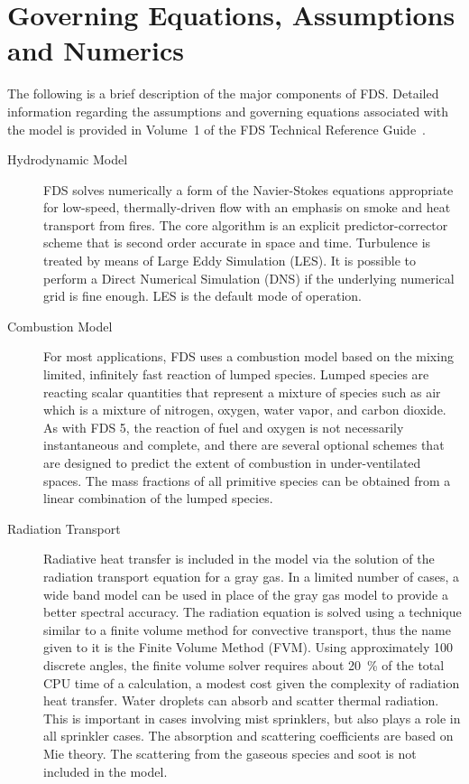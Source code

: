 \documentclass[11pt]{book}
\begin{document}
\section{Governing Equations, Assumptions and Numerics}

The following is a brief description of the major components of FDS. Detailed information regarding the assumptions and governing equations associated with the model is provided in Volume~1 of the FDS Technical Reference Guide~\cite{FDS_Tech_Guide}.
\begin{description}
\item[Hydrodynamic Model] FDS solves numerically a form of the Navier-Stokes equations appropriate for low-speed, thermally-driven flow with an emphasis on smoke and heat transport from fires. The core algorithm is an explicit predictor-corrector scheme that is second order accurate in space and time. Turbulence is treated by means of Large Eddy Simulation (LES). It is possible to perform a Direct Numerical Simulation (DNS) if the underlying numerical grid is fine enough. LES is the default mode of operation.
\item[Combustion Model] For most applications, FDS uses a combustion model based on the mixing limited, infinitely fast reaction of lumped species. Lumped species are reacting scalar quantities that represent a mixture of species such as air which is a mixture of nitrogen, oxygen, water vapor, and carbon dioxide. As with FDS 5, the reaction of fuel and oxygen is not necessarily instantaneous and complete, and there are several optional schemes that are designed to predict the extent of combustion in under-ventilated spaces. The mass fractions of all primitive species can be obtained from a linear combination of the lumped species.
\item[Radiation Transport] Radiative heat transfer is included in the model via the solution of the radiation transport equation for a gray gas. In a limited number of cases, a wide band model can be used in place of the gray gas model to provide a better spectral accuracy. The radiation equation is solved using a technique similar to a finite volume method for convective transport, thus the name given to it is the Finite Volume Method (FVM). Using approximately 100 discrete angles, the finite volume solver requires about 20~\% of the total CPU time of a calculation, a modest cost given the complexity of radiation heat transfer.  Water droplets can absorb and scatter thermal radiation. This is important in cases involving mist sprinklers, but also plays a role in all sprinkler cases. The absorption and scattering coefficients are based on Mie theory. The scattering from the gaseous species and soot is not included in the model.

\end{description}
\end{document}
